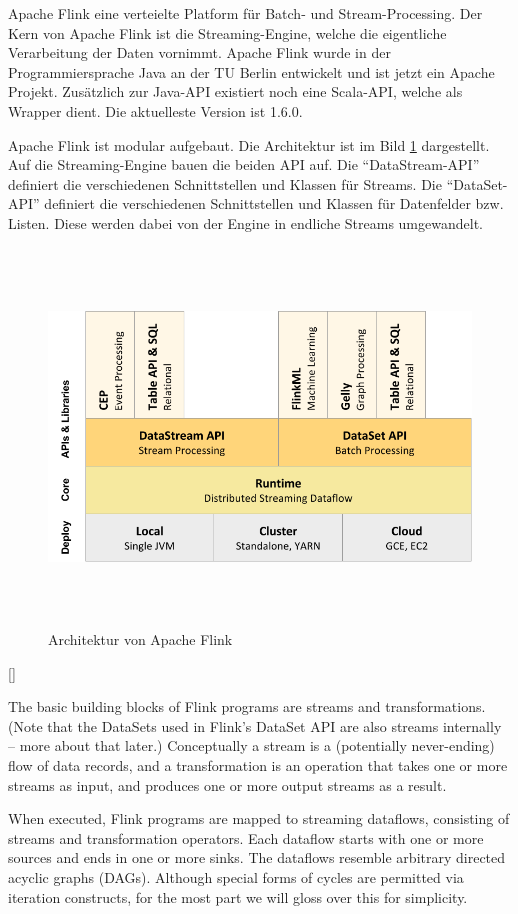 Apache Flink eine verteielte Platform für Batch- und Stream-Processing. Der Kern
von Apache Flink ist die Streaming-Engine, welche die eigentliche Verarbeitung
der Daten vornimmt. Apache Flink wurde in der Programmiersprache Java an der TU
Berlin entwickelt und ist jetzt ein Apache Projekt. Zusätzlich zur Java-\gls{API}
existiert noch eine Scala-\gls{API}, welche als Wrapper dient. Die aktuelleste
Version ist 1.6.0. 

Apache Flink ist modular aufgebaut. Die Architektur ist im Bild \ref{fig:flink-architecture}
dargestellt. Auf die Streaming-Engine bauen die beiden \gls{API} auf.
Die \enquote{DataStream-API} definiert die verschiedenen Schnittstellen und Klassen
für Streams. Die \enquote{DataSet-API} definiert die verschiedenen Schnittstellen
und Klassen für Datenfelder bzw. Listen. Diese werden dabei von der Engine in
endliche Streams umgewandelt.

\begin{figure}
\centering
\includegraphics[height=10cm, width=15cm]{../material/images/flink-stack-graphic.png}
\caption{Architektur von Apache Flink \cite{Foundation2018}}
\label{fig:flink-architecture}
\end{figure}

[\cite{Foundation2018}]{
The basic building blocks of Flink programs are streams and transformations.
(Note that the DataSets used in Flink’s DataSet API are also streams internally
– more about that later.) Conceptually a stream is a (potentially never-ending)
flow of data records, and a transformation is an operation that takes one or
more streams as input, and produces one or more output streams as a result.

When executed, Flink programs are mapped to streaming dataflows, consisting of
streams and transformation operators. Each dataflow starts with one or more
sources and ends in one or more sinks. The dataflows resemble arbitrary
directed acyclic graphs (DAGs). Although special forms of cycles are permitted
via iteration constructs, for the most part we will gloss over this for
simplicity.
}

